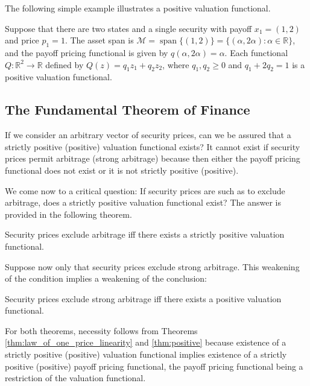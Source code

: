 \documentclass[\topdir/lecture\_notes.tex]{subfiles}
\begin{document}
The following simple example illustrates a positive valuation functional.

\begin{example} \label{ex:positive_valuation_functional}
Suppose that there are two states and a single security with payoff \(x_{1}=(1,2)\) and price \(p_{1}=1\). The asset span is \(\mathcal{M}=\operatorname{span}\{(1,2)\}=\{(\alpha, 2 \alpha) \colon \alpha \in \mathbb{R}\}\), and the payoff pricing functional is given by \(q(\alpha, 2 \alpha)=\alpha\). Each functional \(Q \colon \mathbb{R}^{2} \rightarrow \mathbb{R}\) defined by \(Q(z)=q_{1} z_{1}+q_{2} z_{2}\), where \(q_{1}, q_{2} \geq 0\) and \(q_{1}+2 q_{2}=1\) is a positive valuation functional.
\end{example}

\subsection{The Fundamental Theorem of Finance}
If we consider an arbitrary vector of security prices, can we be assured that a strictly positive (positive) valuation functional exists? It cannot exist if security prices permit arbitrage (strong arbitrage) because then either the payoff pricing functional does not exist or it is not strictly positive (positive).

We come now to a critical question: If security prices are such as to exclude arbitrage, does a strictly positive valuation functional exist? The answer is provided in the following theorem.

\begin{theorem}\label{thm:fundamental_theorem_finance}
Security prices exclude arbitrage iff there exists a strictly positive valuation functional.
\end{theorem}
Suppose now only that security prices exclude strong arbitrage. This weakening of the condition implies a weakening of the conclusion:

\begin{theorem}\label{thm:fundamental_theorem_finance_weak}
Security prices exclude strong arbitrage iff there exists a positive valuation functional.
\end{theorem}

For both theorems, necessity follows from Theorems \ref{thm:law_of_one_price_linearity} and \ref{thm:positive} because existence of a strictly positive (positive) valuation functional implies existence of a strictly positive (positive) payoff pricing functional, the payoff pricing functional being a restriction of the valuation functional. 
\end{document}
